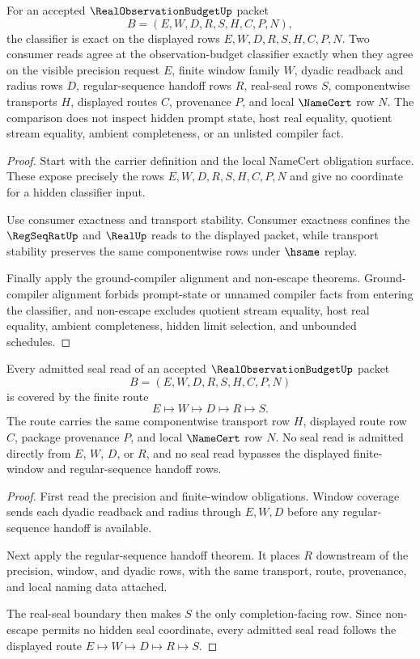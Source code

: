 \begin{theorem}
\label{thm:real-observation-budget-classifier-exactness}
For an accepted $\RealObservationBudgetUp$ packet
$$
B=(E,W,D,R,S,H,C,P,N),
$$
the classifier is exact on the displayed rows $E,W,D,R,S,H,C,P,N$. Two consumer reads agree at the observation-budget classifier exactly when they agree on the visible precision request $E$, finite window family $W$, dyadic readback and radius rows $D$, regular-sequence handoff rows $R$, real-seal rows $S$, componentwise transports $H$, displayed routes $C$, provenance $P$, and local $\NameCert$ row $N$. The comparison does not inspect hidden prompt state, host real equality, quotient stream equality, ambient completeness, or an unlisted compiler fact.
\end{theorem}
\begin{proof}
Start with the carrier definition and the local NameCert obligation surface. These expose precisely the rows $E,W,D,R,S,H,C,P,N$ and give no coordinate for a hidden classifier input.

Use consumer exactness and transport stability. Consumer exactness confines the $\RegSeqRatUp$ and $\RealUp$ reads to the displayed packet, while transport stability preserves the same componentwise rows under $\hsame$ replay.

Finally apply the ground-compiler alignment and non-escape theorems. Ground-compiler alignment forbids prompt-state or unnamed compiler facts from entering the classifier, and non-escape excludes quotient stream equality, host real equality, ambient completeness, hidden limit selection, and unbounded schedules.
\end{proof}

\begin{theorem}
\label{thm:real-observation-budget-finite-route-coverage}
Every admitted seal read of an accepted $\RealObservationBudgetUp$ packet
$$
B=(E,W,D,R,S,H,C,P,N)
$$
is covered by the finite route
$$
E \longmapsto W \longmapsto D \longmapsto R \longmapsto S.
$$
The route carries the same componentwise transport row $H$, displayed route row $C$, package provenance $P$, and local $\NameCert$ row $N$. No seal read is admitted directly from $E$, $W$, $D$, or $R$, and no seal read bypasses the displayed finite-window and regular-sequence handoff rows.
\end{theorem}
\begin{proof}
First read the precision and finite-window obligations. Window coverage sends each dyadic readback and radius through $E,W,D$ before any regular-sequence handoff is available.

Next apply the regular-sequence handoff theorem. It places $R$ downstream of the precision, window, and dyadic rows, with the same transport, route, provenance, and local naming data attached.

The real-seal boundary then makes $S$ the only completion-facing row. Since non-escape permits no hidden seal coordinate, every admitted seal read follows the displayed route $E \longmapsto W \longmapsto D \longmapsto R \longmapsto S$.
\end{proof}

